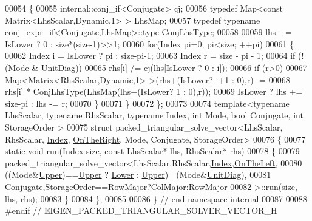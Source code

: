 \begin{DoxyCode}
00054   \{
00055     internal::conj\_if<Conjugate> cj;
00056     \textcolor{keyword}{typedef} Map<const Matrix<LhsScalar,Dynamic,1> > LhsMap;
00057     \textcolor{keyword}{typedef} \textcolor{keyword}{typename} conj\_expr\_if<Conjugate,LhsMap>::type ConjLhsType;
00058 
00059     lhs += IsLower ? 0 : size*(size-1)>>1;
00060     \textcolor{keywordflow}{for}(Index pi=0; pi<size; ++pi)
00061     \{
00062       \hyperlink{namespace_eigen_a62e77e0933482dafde8fe197d9a2cfde}{Index} i = IsLower ? pi : size-pi-1;
00063       \hyperlink{namespace_eigen_a62e77e0933482dafde8fe197d9a2cfde}{Index} r = size - pi - 1;
00064       \textcolor{keywordflow}{if} (!(Mode & \hyperlink{group__enums_gga39e3366ff5554d731e7dc8bb642f83cdaddb72f888ac85d5a1c52333e54f9374b}{UnitDiag}))
00065     rhs[i] /= cj(lhs[IsLower ? 0 : i]);
00066       \textcolor{keywordflow}{if} (r>0)
00067     Map<Matrix<RhsScalar,Dynamic,1> >(rhs+(IsLower? i+1 : 0),r) -=
00068         rhs[i] * ConjLhsType(LhsMap(lhs+(IsLower? 1 : 0),r));
00069       IsLower ? lhs += size-pi : lhs -= r;
00070     \}
00071   \}
00072 \};
00073 
00074 \textcolor{keyword}{template}<\textcolor{keyword}{typename} LhsScalar, \textcolor{keyword}{typename} RhsScalar, \textcolor{keyword}{typename} Index, \textcolor{keywordtype}{int} Mode, \textcolor{keywordtype}{bool} Conjugate, \textcolor{keywordtype}{int} StorageOrder
      >
00075 \textcolor{keyword}{struct }packed\_triangular\_solve\_vector<LhsScalar, RhsScalar, \hyperlink{namespace_eigen_a62e77e0933482dafde8fe197d9a2cfde}{Index}, 
      \hyperlink{group__enums_ggac22de43beeac7a78b384f99bed5cee0ba99dc75d8e00b6c3a5bdc31940f47492b}{OnTheRight}, Mode, Conjugate, StorageOrder>
00076 \{
00077   \textcolor{keyword}{static} \textcolor{keywordtype}{void} run(Index size, \textcolor{keyword}{const} LhsScalar* lhs, RhsScalar* rhs)
00078   \{
00079     packed\_triangular\_solve\_vector<LhsScalar,RhsScalar,\hyperlink{namespace_eigen_a62e77e0933482dafde8fe197d9a2cfde}{Index},\hyperlink{group__enums_ggac22de43beeac7a78b384f99bed5cee0ba129609b3bdf23b071f5f86cf2f995ec4}{OnTheLeft},
00080     ((Mode&\hyperlink{group__enums_gga39e3366ff5554d731e7dc8bb642f83cda6bcb58be3b8b8ec84859ce0c5ac0aaec}{Upper})==\hyperlink{group__enums_gga39e3366ff5554d731e7dc8bb642f83cda6bcb58be3b8b8ec84859ce0c5ac0aaec}{Upper} ? \hyperlink{group__enums_gga39e3366ff5554d731e7dc8bb642f83cda891792b8ed394f7607ab16dd716f60e6}{Lower} : \hyperlink{group__enums_gga39e3366ff5554d731e7dc8bb642f83cda6bcb58be3b8b8ec84859ce0c5ac0aaec}{Upper}) | (Mode&\hyperlink{group__enums_gga39e3366ff5554d731e7dc8bb642f83cdaddb72f888ac85d5a1c52333e54f9374b}{UnitDiag}),
00081     Conjugate,StorageOrder==\hyperlink{group__enums_ggaacded1a18ae58b0f554751f6cdf9eb13acfcde9cd8677c5f7caf6bd603666aae3}{RowMajor}?\hyperlink{group__enums_ggaacded1a18ae58b0f554751f6cdf9eb13a0cbd4bdd0abcfc0224c5fcb5e4f6669a}{ColMajor}:\hyperlink{group__enums_ggaacded1a18ae58b0f554751f6cdf9eb13acfcde9cd8677c5f7caf6bd603666aae3}{RowMajor}
00082       >::run(size, lhs, rhs);
00083   \}
00084 \};
00085 
00086 \} \textcolor{comment}{// end namespace internal}
00087 
00088 \textcolor{preprocessor}{#endif // EIGEN\_PACKED\_TRIANGULAR\_SOLVER\_VECTOR\_H}
\end{DoxyCode}
